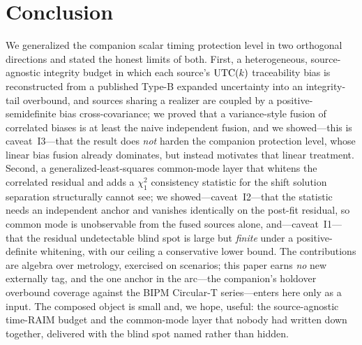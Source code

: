 \section{Conclusion}
\label{sec:conclusion}

We generalized the companion scalar timing protection level
\citep{baweja2026cti} in two orthogonal directions and stated the honest limits of
both. First, a heterogeneous, source-agnostic integrity budget in which each
source's $\mathrm{UTC}(k){}$ traceability bias is reconstructed from a published Type-B
expanded uncertainty into an integrity-tail overbound, and sources sharing a
realizer are coupled by a positive-semidefinite bias cross-covariance; we proved
that a variance-style fusion of correlated biases is at least the naive independent
fusion, and we showed---this is caveat~I3---that the result does \emph{not} harden
the companion protection level, whose linear bias fusion already dominates, but
instead motivates that linear treatment. Second, a generalized-least-squares
common-mode layer that whitens the correlated residual and adds a $\chi^2_1$
consistency statistic for the shift solution separation structurally cannot see;
we showed---caveat~I2---that the statistic needs an independent anchor and vanishes
identically on the post-fit residual, so common mode is unobservable from the fused
sources alone, and---caveat~I1---that the residual undetectable blind spot is large
but \emph{finite} under a positive-definite whitening, with our ceiling a
conservative lower bound. The contributions are \Proven{} algebra over \Cited{}
metrology, exercised on \Modelled{} scenarios; this paper earns \emph{no} new
externally \Validated{} tag, and the one \Validated{} anchor in the arc---the
companion's holdover overbound coverage against the BIPM Circular-T series---enters
here only as a \Cited{} input. The composed object is small and, we hope, useful:
the source-agnostic time-RAIM budget and the common-mode layer that nobody had
written down together, delivered with the blind spot named rather than hidden.

